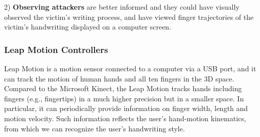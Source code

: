 2) \textbf{Observing attackers} are better informed and they could have visually observed the victim's writing process, %
and have viewed finger trajectories of the victim's handwriting displayed on a computer screen.  







\subsubsection{Leap Motion Controllers}

Leap Motion is a motion sensor connected to a computer via a USB port, and it can track the motion of human hands and all ten fingers in the 3D space. Compared to the Microsoft Kinect, the Leap Motion tracks hands including fingers (e.g., fingertips) in a much higher precision but in a smaller space. 
In particular, it can periodically provide
information on finger width, length and motion velocity.   
Such information reflects the user's hand-motion kinematics, from which we can 
recognize the user's handwriting style.

